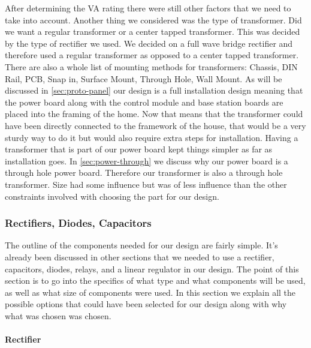 After determining the VA rating there were still other factors
that we need to take into account. Another thing we considered was the type of
transformer. Did we want a regular transformer or a center tapped transformer.
This was decided by the type of rectifier we used. We decided on a full wave
bridge rectifier and therefore used a regular transformer as opposed
to a center tapped transformer. There are also a whole list of mounting
methods for transformers: Chassis, DIN Rail, PCB, Snap in, Surface Mount,
Through Hole, Wall Mount. As will be discussed in \autoref{sec:proto-panel} our
design is a full installation design meaning that the power board along with
the control module and base station boards are placed into the framing of
the home. Now that means that the transformer could have been directly connected to
the framework of the house, that would be a very sturdy way to do it but
would also require extra steps for installation. Having a transformer that is
part of our power board kept things simpler as far as installation goes.
In \autoref{sec:power-through} we discuss why our power board is a
through hole power board.  Therefore our transformer is also a through hole transformer. Size had some
influence but was of less influence than the other constraints involved with
choosing the part for our design.

\subsubsection{Rectifiers, Diodes, Capacitors}
The outline of the components needed for our design are fairly simple. It{}'s
already been discussed in other sections that we needed to use a rectifier,
capacitors, diodes, relays, and a linear regulator in our design. The point of
this section is to go into the specifics of what type and what components will
be used, as well as what size of components were used. In this section we
explain all the possible options that could have been selected for our design
along with why what was chosen was chosen.

\paragraph{Rectifier}

